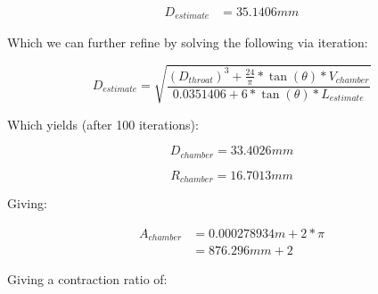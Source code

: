 \documentclass[12pt]{report}
\begin{document}
\begin{equation}
\begin{split}
\boldsymbol{\mathit{D_{estimate}}} & = 35.1406 mm 
\end{split}
\end{equation}


Which we can further refine by solving the following via iteration:



\vspace{10 mm}

\begin{equation}
\boldsymbol{\mathit{D_{estimate}}} = \sqrt{\frac{{\left(\boldsymbol{\mathit{D_{throat}}}\right)}^{3} + \frac{24}{\mathit{\pi}} * \tan{\left(\mathit{\theta}\right)} * \boldsymbol{\mathit{V_{chamber}}}}{0.0351406 + 6 * \tan{\left(\mathit{\theta}\right)} * \boldsymbol{\mathit{L_{estimate}}}}}
\end{equation}


\vspace{10 mm}

Which yields (after 100 iterations):

 

\vspace{6 mm}

\begin{equation}
\boldsymbol{\mathit{D_{chamber}}} = 33.4026 mm 
\end{equation}


\begin{equation}
\boldsymbol{\mathit{R_{chamber}}} = 16.7013 mm 
\end{equation}


\vspace{10 mm}

Giving:



\vspace{6 mm}

\begin{equation}
\begin{split}
\boldsymbol{\mathit{A_{chamber}}} & = 0.000278934 m+2 * \mathit{\pi}\\
 & = 876.296 mm+2 
\end{split}
\end{equation}


\vspace{6 mm}

Giving a contraction ratio of:
\end{document}
